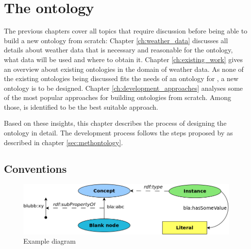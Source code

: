 \chapter{The \thinkhomeweather ontology}
\label{ch:thinkhomeweather_ontology}





The previous chapters cover all topics that require discussion before being able to build a new ontology from scratch: Chapter \ref{ch:weather_data} discusses all details about weather data that is necessary and reasonable for the \thinkhomeweather ontology, what data will be used and where to obtain it. Chapter \ref{ch:existing_work} gives an overview about existing ontologies in the domain of weather data. As none of the existing ontologies being discussed fits the needs of an ontology for \thinkhome, a new ontology is to be designed. Chapter \ref{ch:development_approaches} analyses some of the most popular approaches for building ontologies from scratch. Among those, \methontology \cite{Methontology} is identified to be the best suitable approach.

Based on these insights, this chapter describes the process of designing the \thinkhomeweather ontology in detail. The development process follows the steps proposed by \methontology as described in chapter \ref{sec:methontology}.

\section{Conventions}
\label{sec:ontology_conventions}

\begin{figure}
  \includegraphics[width=\textwidth]{figures/diagrams/template.png}
  \caption{Example diagram}
  \label{fig:diagram_example}
\end{figure}


